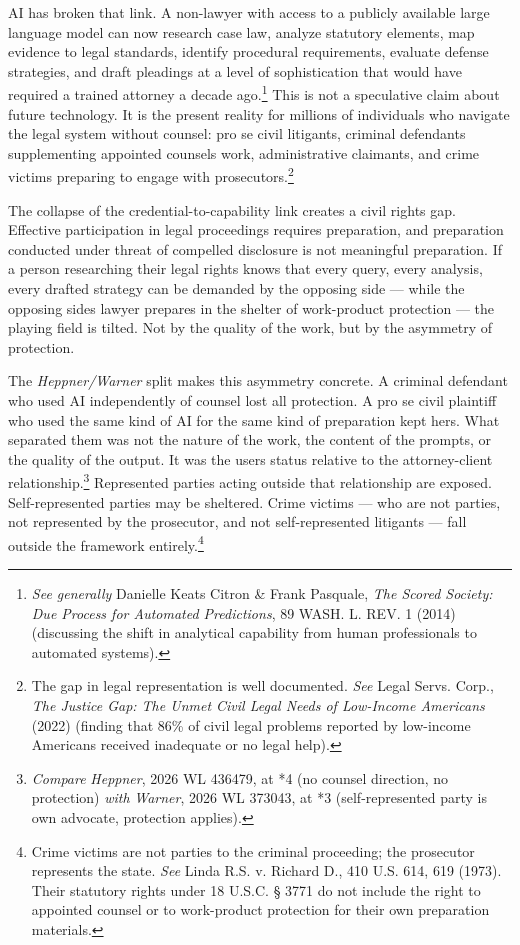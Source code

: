 \documentclass[
  12pt,
]{article}
\begin{document}
AI has broken that link. A non-lawyer with access to a publicly
available large language model can now research case law, analyze
statutory elements, map evidence to legal standards, identify procedural
requirements, evaluate defense strategies, and draft pleadings at a
level of sophistication that would have required a trained attorney a
decade ago.\footnote{\emph{See generally} Danielle Keats Citron \& Frank
  Pasquale, \emph{The Scored Society: Due Process for Automated
  Predictions}, 89 WASH. L. REV. 1 (2014) (discussing the shift in
  analytical capability from human professionals to automated systems).}
This is not a speculative claim about future technology. It is the
present reality for millions of individuals who navigate the legal
system without counsel: pro se civil litigants, criminal defendants
supplementing appointed counsel\textquotesingle s work, administrative
claimants, and crime victims preparing to engage with
prosecutors.\footnote{The gap in legal representation is well
  documented. \emph{See} Legal Servs. Corp., \emph{The Justice Gap: The
  Unmet Civil Legal Needs of Low-Income Americans} (2022) (finding that
  86\% of civil legal problems reported by low-income Americans received
  inadequate or no legal help).}

The collapse of the credential-to-capability link creates a civil rights
gap. Effective participation in legal proceedings requires preparation,
and preparation conducted under threat of compelled disclosure is not
meaningful preparation. If a person researching their legal rights knows
that every query, every analysis, every drafted strategy can be demanded
by the opposing side --- while the opposing side\textquotesingle s
lawyer prepares in the shelter of work-product protection --- the
playing field is tilted. Not by the quality of the work, but by the
asymmetry of protection.

The \emph{Heppner/Warner} split makes this asymmetry concrete. A
criminal defendant who used AI independently of counsel lost all
protection. A pro se civil plaintiff who used the same kind of AI for
the same kind of preparation kept hers. What separated them was not the
nature of the work, the content of the prompts, or the quality of the
output. It was the user\textquotesingle s status relative to the
attorney-client relationship.\footnote{\emph{Compare} \emph{Heppner},
  2026 WL 436479, at *4 (no counsel direction, no protection)
  \emph{with} \emph{Warner}, 2026 WL 373043, at *3 (self-represented
  party is own advocate, protection applies).} Represented parties
acting outside that relationship are exposed. Self-represented parties
may be sheltered. Crime victims --- who are not parties, not represented
by the prosecutor, and not self-represented litigants --- fall outside
the framework entirely.\footnote{Crime victims are not parties to the
  criminal proceeding; the prosecutor represents the state. \emph{See}
  Linda R.S. v. Richard D., 410 U.S. 614, 619 (1973). Their statutory
  rights under 18 U.S.C. § 3771 do not include the right to appointed
  counsel or to work-product protection for their own preparation
  materials.}
\end{document}
